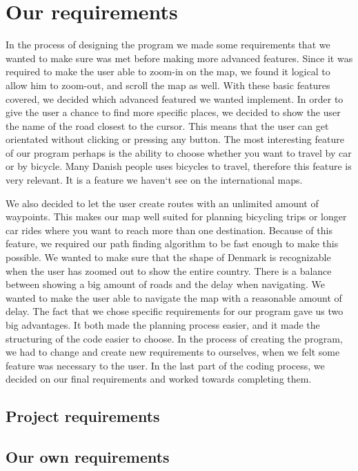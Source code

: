 \label{BG-R}
\section{Our requirements}
In the process of designing the program we made some requirements that we
wanted to make sure was met before making more advanced features. Since it was
required to make the user able to zoom-in on the map, we found it logical to
allow him to zoom-out, and scroll the map as well. With these basic features
covered, we decided which advanced featured we wanted implement. In order to
give the user a chance to find more specific places, we decided to show the
user the name of the road closest to the cursor. This means that the user can
get orientated without clicking or pressing any button. The most interesting
feature of our program perhaps is the ability to choose whether you want to
travel by car or by bicycle. Many Danish people uses bicycles to travel,
therefore this feature is very relevant. It is a feature we haven`t see on the
international maps. 

We also decided to let the user create routes with
an unlimited amount of waypoints. This makes our map well suited for planning
bicycling trips or longer car rides where you want to reach more than one destination. Because of
this feature, we required our path finding algorithm to be fast enough to make
this possible. We wanted to make sure that the shape of Denmark is recognizable
when the user has zoomed out to show the entire country. There is a balance
between showing a big amount of roads and the delay when navigating. We wanted
to make the user able to navigate the map with a reasonable amount of delay.
The fact that we chose specific requirements for our program gave us two big
advantages. It both made the planning process easier, and it made the structuring
of the code easier to choose. In the process of creating the program, we had to change and create new requirements to ourselves, when we felt some feature was
necessary to the user. In the last part of the coding process, we
decided on our final requirements and worked towards completing them.
\subsection{Project requirements}
\label{BG-R-PR}
\subsection{Our own requirements}
\label{BG-R-OOR}

